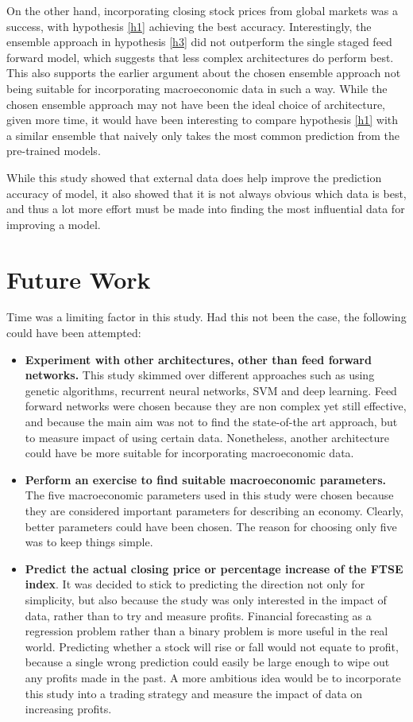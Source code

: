\documentclass{UoYCSproject}
\begin{document}
On the other hand, incorporating closing stock prices from global markets was a success, with hypothesis \ref{h1} achieving the best accuracy. Interestingly, the ensemble approach in hypothesis \ref{h3} did not outperform the single staged feed forward model, which suggests that less complex architectures do perform best. This also supports the earlier argument about the chosen ensemble approach not being suitable for incorporating macroeconomic data in such a way. While the chosen ensemble approach may not have been the ideal choice of architecture, given more time, it would have been interesting to compare hypothesis \ref{h1} with a similar ensemble that naively only takes the most common prediction from the pre-trained models.

While this study showed that external data does help improve the prediction accuracy of model, it also showed that it is not always obvious which data is best, and thus a lot more effort must be made into finding the most influential data for improving a model.

\section{Future Work}
Time was a limiting factor in this study. Had this not been the case, the following could have been attempted:
\begin{itemize}
    \item \textbf{Experiment with other architectures, other than feed forward networks.} This study skimmed over different approaches such as using genetic algorithms, recurrent neural networks, SVM and deep learning. Feed forward networks were chosen because they are non complex yet still effective, and because the main aim was not to find the state-of-the art approach, but to measure impact of using certain data. Nonetheless, another architecture could have be more suitable for incorporating macroeconomic data. 
    \item \textbf{Perform an exercise to find suitable macroeconomic parameters.} The five macroeconomic parameters used in this study were chosen because they are considered important parameters for describing an economy. Clearly, better parameters could have been chosen. The reason for choosing only five was to keep things simple. 
    \item \textbf{Predict the actual closing price or percentage increase of the FTSE index}. It was decided to stick to predicting the direction not only for simplicity, but also because the study was only interested in the impact of data, rather than to try and measure profits. Financial forecasting as a regression problem rather than a binary problem is more useful in the real world. Predicting whether a stock will rise or fall would not equate to profit, because a single wrong prediction could easily be large enough to wipe out any profits made in the past. A more ambitious idea would be to incorporate this study into a trading strategy and measure the impact of data on increasing profits. 
\end{itemize}

\printbibliography
\end{document}

